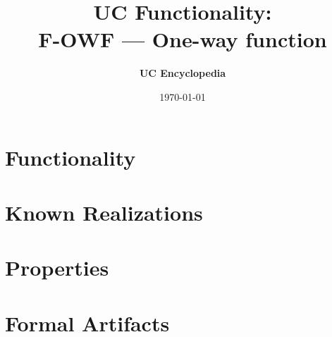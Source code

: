 \documentclass[11pt,a4paper]{article}
\title{\textbf{\Large UC Functionality:}\\[0.2em] \Large F-OWF --- One-way function}
\author{\textbf{UC Encyclopedia}}
\date{\today}
\newtheorem{functionality}{Functionality}
\begin{document}
\maketitle

\begin{abstract}
\end{abstract}

\section{Functionality}

%

\section{Known Realizations}


\section{Properties}


\section{Formal Artifacts}

\end{document}
